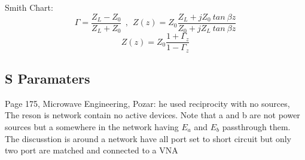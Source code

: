 \par
Smith Chart:
$${\Gamma} = \frac{Z_L - Z_0}{Z_L+Z_0} ~~ , ~~ Z(z) = Z_0 \frac{Z_L + jZ_0~tan~\beta z}{Z_0 + jZ_L~tan~\beta z}$$
$$ Z(z) = Z_0 \frac{1 + \Gamma_z}{1 - \Gamma_z} $$
\hspace{.02\textwidth}

\par
\setlength{\parindent}{0.0cm} %

\subsection{S Paramaters}
Page 175, Microwave Engineering, Pozar: he used reciprocity with no sources, The reson is network contain no active devices. Note that a and b are not power sources but a somewhere in the network having $E_a$ and $E_b$ passthrough them. The discusstion is around a network have all port set to short circuit but only two port are matched and connected to a VNA

